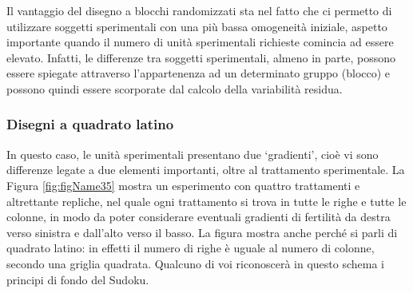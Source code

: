 \documentclass[a4paper,12pt,oneside]{book}
\begin{document}
Il vantaggio del disegno a blocchi randomizzati sta nel fatto che ci permetto di utilizzare soggetti sperimentali con una più bassa omogeneità iniziale, aspetto importante quando il numero di unità sperimentali richieste comincia ad essere elevato. Infatti, le differenze tra soggetti sperimentali, almeno in parte, possono essere spiegate attraverso l'appartenenza ad un determinato gruppo (blocco) e possono quindi essere scorporate dal calcolo della variabilità residua.

\hypertarget{disegni-a-quadrato-latino}{%
\subsubsection{Disegni a quadrato latino}\label{disegni-a-quadrato-latino}}

In questo caso, le unità sperimentali presentano due `gradienti', cioè vi sono differenze legate a due elementi importanti, oltre al trattamento sperimentale. La Figura \ref{fig:figName35} mostra un esperimento con quattro trattamenti e altrettante repliche, nel quale ogni trattamento si trova in tutte le righe e tutte le colonne, in modo da poter considerare eventuali gradienti di fertilità da destra verso sinistra e dall'alto verso il basso. La figura mostra anche perché si parli di quadrato latino: in effetti il numero di righe è uguale al numero di colonne, secondo una griglia quadrata. Qualcuno di voi riconoscerà in questo schema i principi di fondo del Sudoku.
\end{document}
